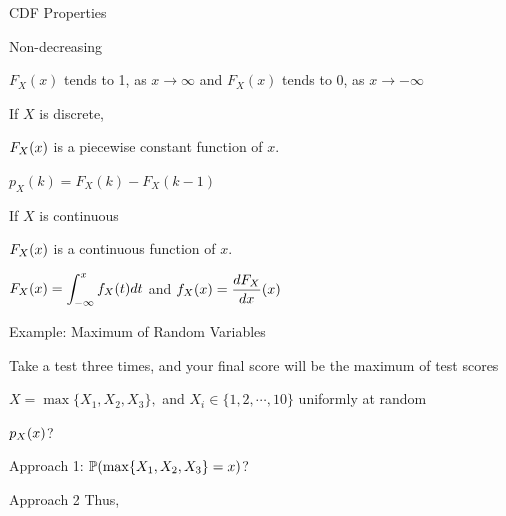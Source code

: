 \begin{frame}{CDF Properties}

\plitemsep 0.07in
\bci
\item<2-> Non-decreasing

\item<3-> $F_X(x)$ tends to 1, as $x \rightarrow \infty$ and $F_X(x)$ tends to 0, as $x \rightarrow -\infty$

\item<4-> If $X$ is discrete,
\bci
\item $F_X(x)$ is a piecewise constant function of $x.$
\item $p_X(k) = F_X(k) - F_X(k-1)$
\eci
\item<5-> If $X$ is continuous
\bci
\item $F_X(x)$ is a continuous function of $x.$
\item $\displaystyle F_X(x) = \int_{-\infty}^x f_X(t) dt$ and $\displaystyle f_X(x) = \frac{dF_X}{dx}(x)$
\eci

\eci
%
\end{frame}

\begin{frame}{Example: Maximum of Random Variables}

\plitemsep 0.07in
\bci
\item Take a test three times, and your final score will be the maximum of test scores

\item $X = \max\{X_1, X_2, X_3 \},$ and $X_i \in \{1, 2, \cdots, 10 \}$ uniformly at random
\item \question $p_X(x)$?

\item Approach 1: $\mathbb{P}( \max\{X_1, X_2, X_3 \} = x )$?
\item Approach 2
Thus,
\eci
\end{frame}


